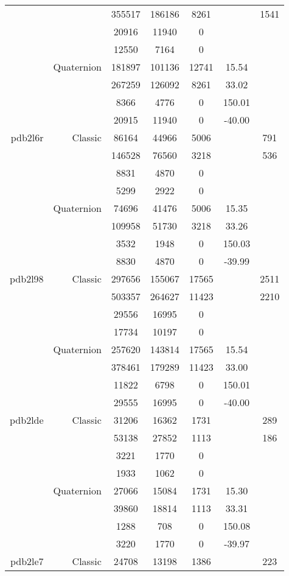 \begin{xltabular}{\textwidth}{r|rcccSc}
& & 355517 & 186186 & 8261 & & 1541 \\
& & 20916 & 11940 & 0 & & \\
& & 12550 & 7164 & 0 & & \\
& Quaternion & 181897 & 101136 & 12741 & 15.54 & \\
& & 267259 & 126092 & 8261 & 33.02 & \\
& & 8366 & 4776 & 0 & 150.01 & \\
& & 20915 & 11940 & 0 & -40.00 & \\ \addlinespace
pdb2l6r & Classic & 86164 & 44966 & 5006 & & 791 \\
& & 146528 & 76560 & 3218 & & 536 \\
& & 8831 & 4870 & 0 & & \\
& & 5299 & 2922 & 0 & & \\
& Quaternion & 74696 & 41476 & 5006 & 15.35 & \\
& & 109958 & 51730 & 3218 & 33.26 & \\
& & 3532 & 1948 & 0 & 150.03 & \\
& & 8830 & 4870 & 0 & -39.99 & \\ \addlinespace
pdb2l98 & Classic & 297656 & 155067 & 17565 & & 2511 \\
& & 503357 & 264627 & 11423 & & 2210 \\
& & 29556 & 16995 & 0 & & \\
& & 17734 & 10197 & 0 & & \\
& Quaternion & 257620 & 143814 & 17565 & 15.54 & \\
& & 378461 & 179289 & 11423 & 33.00 & \\
& & 11822 & 6798 & 0 & 150.01 & \\
& & 29555 & 16995 & 0 & -40.00 & \\ \addlinespace
pdb2lde & Classic & 31206 & 16362 & 1731 & & 289 \\
& & 53138 & 27852 & 1113 & & 186 \\
& & 3221 & 1770 & 0 & & \\
& & 1933 & 1062 & 0 & & \\
& Quaternion & 27066 & 15084 & 1731 & 15.30 & \\
& & 39860 & 18814 & 1113 & 33.31 & \\
& & 1288 & 708 & 0 & 150.08 & \\
& & 3220 & 1770 & 0 & -39.97 & \\ \addlinespace
pdb2le7 & Classic & 24708 & 13198 & 1386 & & 223 \\

\end{xltabular}
